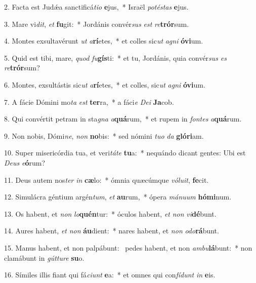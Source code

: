 2. Facta est Judǽa sanctificá\textit{ti}\textit{o} \textbf{e}jus,~*  Israël \textit{pot}\textit{és}\textit{tas} \textbf{e}jus.\

3. Mare vi\textit{dit}, \textit{et} \textbf{fu}git:~*  Jordánis convér\textit{sus} \textit{est} \textit{re}\textbf{trór}sum.\

4. Montes exsultavérunt \textit{ut} \textit{a}\textbf{rí}etes,~*  et colles sic\textit{ut} \textit{a}\textit{gni} \textbf{ó}\textbf{vi}um.\

5. Quid est tibi, mare, \textit{quod} \textit{fu}\textbf{gís}ti:~*  et tu, Jordánis, quia convér\textit{sus} \textit{es} \textit{re}\textbf{trór}sum?\

6. Montes, exsultástis sic\textit{ut} \textit{a}\textbf{rí}etes,~*  et colles, sic\textit{ut} \textit{a}\textit{gni} \textbf{ó}\textbf{vi}um.\

7. A fácie Dómini mo\textit{ta} \textit{est} \textbf{ter}ra,~*  a fáci\textit{e} \textit{De}\textit{i} \textbf{Ja}cob.\

8. Qui convértit petram in sta\textit{gna} \textit{a}\textbf{quá}rum,~*  et rupem in \textit{fon}\textit{tes} \textit{a}\textbf{quá}rum.\

9. Non nobis, Dómi\textit{ne}, \textit{non} \textbf{no}bis:~*  sed nómini \textit{tu}\textit{o} \textit{da} \textbf{gló}\textbf{ri}am.\

10. Super misericórdia tua, et veri\textit{tá}\textit{te} \textbf{tu}a:~*  nequándo dicant gentes: Ubi est \textit{De}\textit{us} \textit{e}\textbf{ó}rum?\

11. Deus autem nos\textit{ter} \textit{in} \textbf{cæ}lo:~*  ómnia quæcúmque \textit{vó}\textit{lu}\textit{it}, \textbf{fe}cit.\

12. Simulácra géntium argén\textit{tum}, \textit{et} \textbf{au}rum,~*  ópera \textit{má}\textit{nu}\textit{um} \textbf{hó}\textbf{mi}num.\

13. Os habent, et \textit{non} \textit{lo}\textbf{quén}tur:~*  óculos habent, \textit{et} \textit{non} \textit{vi}\textbf{dé}bunt.\

14. Aures habent, \textit{et} \textit{non} \textbf{áu}dient:~*  nares habent, et \textit{non} \textit{o}\textit{do}\textbf{rá}bunt.\

15. Manus habent, et non palpábunt: \dag\  pedes habent, et non \textit{am}\textit{bu}\textbf{lá}bunt:~*  non clamábunt in \textit{gút}\textit{tu}\textit{re} \textbf{su}o.\

16. Símiles illis fiant qui fá\textit{ci}\textit{unt} \textbf{e}a:~*  et omnes qui con\textit{fí}\textit{dunt} \textit{in} \textbf{e}is.\

